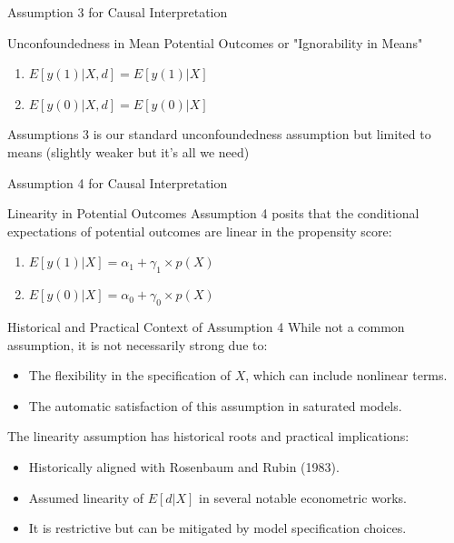 \documentclass{beamer}
\begin{document}
\begin{frame}{Assumption 3 for Causal Interpretation}
  \begin{block}{Unconfoundedness in Mean Potential Outcomes or "Ignorability in Means"}
    \begin{enumerate}
      \item \( E [y(1) | X, d] = E[y(1) | X] \)
      \item \( E[y(0) | X, d] = E[y(0) | X] \)
    \end{enumerate}
  \end{block}
  Assumptions 3 is our standard unconfoundedness assumption but limited to means (slightly weaker but it's all we need)
\end{frame}

\begin{frame}{Assumption 4 for Causal Interpretation}
  \begin{block}{Linearity in Potential Outcomes}
    Assumption 4 posits that the conditional expectations of potential outcomes are linear in the propensity score:
    \begin{enumerate}
      \item \( E[y(1) | X] = \alpha_1 + \gamma_1 \times p(X) \)
      \item \( E[y(0) | X] = \alpha_0 + \gamma_0 \times p(X) \)
    \end{enumerate}
  \end{block}
\end{frame}

\begin{frame}{Historical and Practical Context of Assumption 4}
  While not a common assumption, it is not necessarily strong due to:
  \begin{itemize}
    \item The flexibility in the specification of \( X \), which can include nonlinear terms.
    \item The automatic satisfaction of this assumption in saturated models.
  \end{itemize}

    The linearity assumption has historical roots and practical implications:
    \begin{itemize}
      \item Historically aligned with Rosenbaum and Rubin (1983).
      \item Assumed linearity of \( E[d | X] \) in several notable econometric works.
      \item It is restrictive but can be mitigated by model specification choices.
    \end{itemize}
\end{frame}
\end{document}
